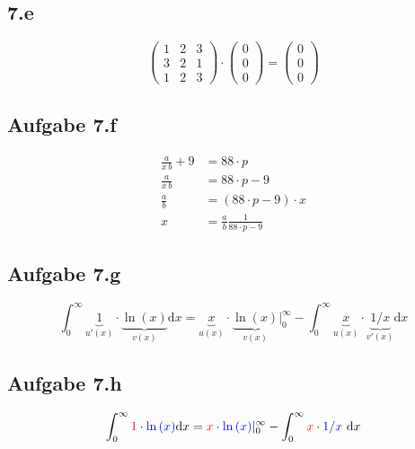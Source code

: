 \documentclass[11pt,
               a4paper,
               parskip=half,
               ]{scrartcl}
\begin{document}
\subsection{7.e}

\begin{displaymath}
\begin{pmatrix}
1 & 2 & 3 \\
3 & 2 & 1 \\
1 & 2 & 3
\end{pmatrix}
\cdot
\begin{pmatrix}
0\\
0\\
0
\end{pmatrix}
=
\begin{pmatrix}
0\\
0\\
0
\end{pmatrix}
\end{displaymath}

\subsection{Aufgabe 7.f}

\begin{align}
    \frac{a}{x\,b} + 9 & = 88\cdot p\\\nonumber
    \frac{a}{x\,b} & = 88\cdot p - 9\\ \nonumber
    \frac{a}{b} & = (88\cdot p - 9)\cdot x\\ \nonumber
    x & = \frac{a}{b} \frac{1}{88\cdot p - 9} \nonumber
\end{align}

\subsection{Aufgabe 7.g}
\begin{equation*}
\int_0^{\infty}\underbrace{1}_{u'(x)}\cdot \underbrace{\ln{(x)}}_{v(x)} \mathrm{d}x = \underbrace{x}_{u(x)}\cdot \underbrace{\ln{(x)}}_{v(x)}|_0^{\infty} - \int_0^{\infty}\underbrace{x}_{u(x)}\cdot \underbrace{1/x}_{v'(x)} \mathrm{d}x
\end{equation*}

\cite{schwarzschild}
\cite{apic}
\subsection{Aufgabe 7.h}
\begin{equation}
\int_0^{\infty}{\color{red}1}\cdot {\color{blue}\ln{(x)}} \mathrm{d}x = {\color{red}x}\cdot {\color{blue}\ln{(x)}}|_0^{\infty} -  \int_0^{\infty}{\color{red}x}\cdot {\color{blue}1/x}\ \mathrm{d}x
\end{equation}
\end{document}
